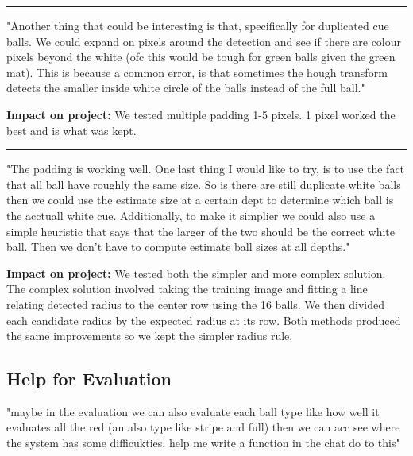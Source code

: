 \documentclass[12pt,a4paper]{article}
\newenvironment{promptentry}{%
    \par\Needspace{7\baselineskip}\addvspace{1.2em}
    \hrule
    \nobreak\vspace{0.5em}
}{\par\addvspace{0.5em}}
\newenvironment{aiprompt}{%
    \begin{list}{}{%
        \setlength{\leftmargin}{1em}%
        \setlength{\rightmargin}{1em}%
        \setlength{\topsep}{0.3em}%
        \setlength{\parsep}{0pt}%
    }%
    \item\relax
}{\end{list}}
\begin{document}
\begin{promptentry}

\begin{aiprompt}
"Another thing that could be interesting is that, specifically for duplicated cue balls.
We could expand on pixels around the detection and see if there are colour pixels beyond the white
(ofc this would be tough for green balls given the green mat).
This is because a common error, is that sometimes the hough transform detects the smaller inside
white circle of the balls instead of the full ball."
\end{aiprompt}

\textbf{Impact on project:} We tested multiple padding 1-5 pixels. 1 pixel worked the 
best and is what was kept.

\end{promptentry}
\FloatBarrier

\begin{promptentry}

\begin{aiprompt}
"The padding is working well. One last thing I would like to try, 
is to use the fact that all ball have roughly the same size.
So is there are still duplicate white balls then we could use the estimate 
size at a certain dept to determine which ball is the acctuall white cue.
Additionally, to make it simplier we could also use a simple heuristic that
says that the larger of the two should be the correct white ball. Then we don't 
have to compute estimate ball sizes at all depths."
\end{aiprompt}

\textbf{Impact on project:} We tested both the simpler and more complex 
solution. The complex solution involved taking the training image and fitting a line 
relating detected radius to the center row using the 16 balls. We then divided each
candidate radius by the expected radius at its row. 
Both methods produced the same improvements so we kept the simpler radius rule.

\end{promptentry}
\FloatBarrier

\subsection{Help for Evaluation}

\begin{aiprompt}
"maybe in the evaluation we can also evaluate each ball type like how well it evaluates all the red (an also type like stripe and full)
then we can acc see where the system has some difficukties.
help me write a function in the chat do to this"
\end{aiprompt}
\end{document}

